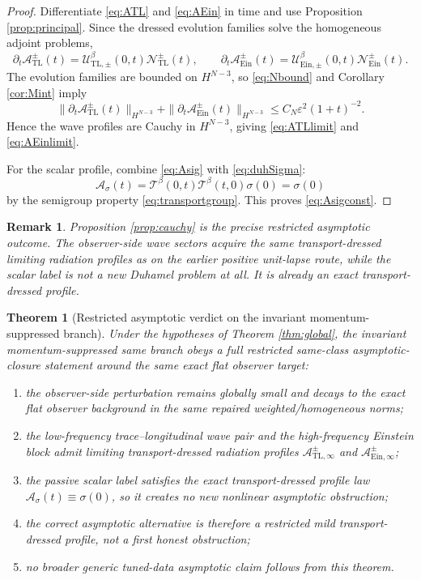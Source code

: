 \documentclass[11pt]{article}
\newtheorem{remark}{Remark}
\newtheorem{theorem}{Theorem}
\begin{document}
\begin{proof}
Differentiate \eqref{eq:ATL} and \eqref{eq:AEin} in time and use Proposition \ref{prop:principal}. Since the dressed evolution families solve the homogeneous adjoint problems,
\[
\partial_t\mathcal A_{\mathrm{TL}}^\pm(t)
=
\mathcal U_{\mathrm{TL},\pm}^\beta(0,t)\mathcal N_{\mathrm{TL}}^\pm(t),
\qquad
\partial_t\mathcal A_{\mathrm{Ein}}^\pm(t)
=
\mathcal U_{\mathrm{Ein},\pm}^\beta(0,t)\mathcal N_{\mathrm{Ein}}^\pm(t).
\]
The evolution families are bounded on \(H^{N-3}\), so \eqref{eq:Nbound} and Corollary \ref{cor:Mint} imply
\[
\|\partial_t\mathcal A_{\mathrm{TL}}^\pm(t)\|_{H^{N-3}}
+ \|\partial_t\mathcal A_{\mathrm{Ein}}^\pm(t)\|_{H^{N-3}}
\le
C_N\varepsilon^2(1+t)^{-2}.
\]
Hence the wave profiles are Cauchy in \(H^{N-3}\), giving \eqref{eq:ATLlimit} and \eqref{eq:AEinlimit}.

For the scalar profile, combine \eqref{eq:Asig} with \eqref{eq:duhSigma}:
\[
\mathcal A_\sigma(t)
=
\mathcal T^\beta(0,t)\mathcal T^\beta(t,0)\sigma(0)
=
\sigma(0)
\]
by the semigroup property \eqref{eq:transportgroup}. This proves \eqref{eq:Asigconst}.
\end{proof}

\begin{remark}
Proposition \ref{prop:cauchy} is the precise restricted asymptotic outcome. The observer-side wave sectors acquire the same transport-dressed limiting radiation profiles as on the earlier positive unit-lapse route, while the scalar label is not a new Duhamel problem at all. It is already an exact transport-dressed profile.
\end{remark}

\begin{theorem}[Restricted asymptotic verdict on the invariant momentum-suppressed branch]
\label{thm:verdict}
Under the hypotheses of Theorem \ref{thm:global}, the invariant momentum-suppressed same branch obeys a full restricted same-class asymptotic-closure statement around the same exact flat observer target:
\begin{enumerate}
    \item the observer-side perturbation remains globally small and decays to the exact flat observer background in the same repaired weighted/homogeneous norms;
    \item the low-frequency trace--longitudinal wave pair and the high-frequency Einstein block admit limiting transport-dressed radiation profiles \(\mathcal A_{\mathrm{TL},\infty}^\pm\) and \(\mathcal A_{\mathrm{Ein},\infty}^\pm\);
    \item the passive scalar label satisfies the exact transport-dressed profile law \(\mathcal A_\sigma(t)\equiv \sigma(0)\), so it creates no new nonlinear asymptotic obstruction;
    \item the correct asymptotic alternative is therefore a restricted mild transport-dressed profile, not a first honest obstruction;
    \item no broader generic tuned-data asymptotic claim follows from this theorem.
\end{enumerate}
\end{theorem}
\end{document}
